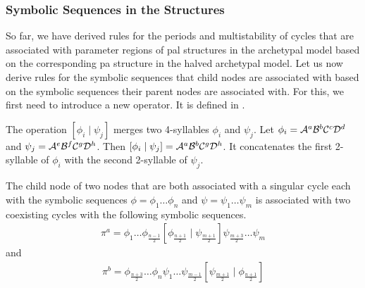 \subsubsection{Symbolic Sequences in the  Structures}

So far, we have derived rules for the periods and multistability of cycles that are associated with parameter regions of \gls{pal} structures in the archetypal model based on the corresponding \gls{pa} structure in the halved archetypal model.
Let us now derive rules for the symbolic sequences that child nodes are associated with based on the symbolic sequences their parent nodes are associated with.
For this, we first need to introduce a new operator.
It is defined in .

\begin{definition}
	\label{def:merge}
	The operation $\left[\phi_i \mid \psi_j\right]$ merges two 4-syllables $\phi_i$ and $\psi_j$.
	Let $\phi_i = \mathcal{A}^a\mathcal{B}^b\mathcal{C}^c\mathcal{D}^d$ and $\psi_j = \mathcal{A}^e\mathcal{B}^f\mathcal{C}^g\mathcal{D}^h$.
	Then $\left[\phi_i \mid \psi_j\right] = \mathcal{A}^a\mathcal{B}^b\mathcal{C}^g\mathcal{D}^h$.
	It concatenates the first 2-syllable of $\phi_i$ with the second 2-syllable of $\psi_j$.
\end{definition}

\begin{theorem}
	\label{theorem:child.symbolic.1}
	The child node of two nodes that are both associated with a singular cycle each with the symbolic sequences $\phi = \phi_1 \dots \phi_n$ and $\psi = \psi_1 \dots \psi_m$ is associated with two coexisting cycles with the following symbolic sequences.
	\begin{align}
		\pi^a = \phi_1 \dots \phi_{\frac{n-1}{2}} \left[\phi_{\frac{n+1}{2}} \mid \psi_{\frac{m+1}{2}}\right] \psi_{\frac{m+3}{2}} \dots \psi_m
	\end{align}
	and
	\begin{align}
		\pi^b = \phi_{\frac{n+3}{2}} \dots \phi_n \psi_1 \dots \psi_{\frac{m-1}{2}} \left[\psi_{\frac{m+1}{2}} \mid \phi_{\frac{n+1}{2}}\right]
	\end{align}
\end{theorem}

\clearpage

